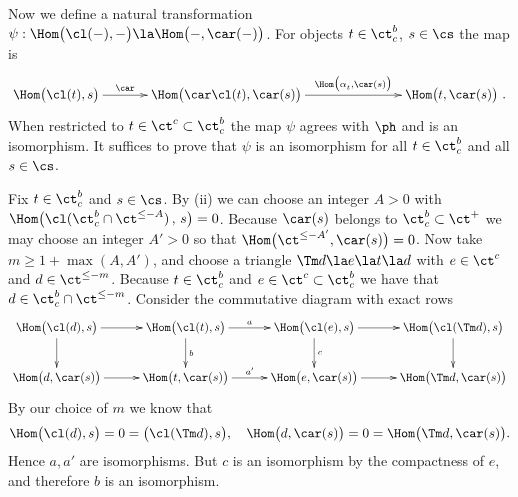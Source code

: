 \documentclass[11pt]{amsart}
\begin{document}
Now we define a natural
transformation $\psi:\Hom\big(\cl(-),-\big)\la \Hom\big(-,\car(-)\big)$.
For objects $t\in\ct^b_c$, $s\in\cs$ the map is
\[\xymatrix@C+10pt{
  \Hom\big(\cl(t),s\big)\ar[r]^-{\car}&\Hom\big(\car\cl(t),\car(s)\big)
  \ar[rr]^-{\Hom\big(\alpha_t^{},\car(s)\big)}
  &&\Hom\big(t,\car(s)\big)\ .
}\]
When restricted to $t\in\ct^c\subset\ct^b_c$ the map $\psi$ agrees with
$\ph$ and is an isomorphism. It suffices to prove that $\psi$ is
an isomorphism for all $t\in\ct^b_c$ and all $s\in\cs$. 

Fix $t\in\ct^b_c$ and $s\in\cs$. By (ii) we can choose an integer $A>0$ with
$\Hom\big(\cl(\ct^b_c\cap\ct^{\leq-A})\,,\,s\big)=0$. Because $\car(s)$ belongs
to $\ct^b_c\subset\ct^+$ we may choose an integer
$A'>0$ so that $\Hom\big(\ct^{\leq-A'},\car(s)\big)=0$. Now take $m\geq1+\max(A,A')$, and choose a triangle $\Tm d\la e\la t\la d$ with $e\in\ct^c$ and
$d\in\ct^{\leq-m}$. Because $t\in\ct^b_c$ and $e\in\ct^c\subset\ct^b_c$
we have that $d\in\ct^b_c\cap\ct^{\leq-m}$.
Consider the commutative diagram with exact rows
\[\xymatrix@C+5pt{
  \Hom\big(\cl(d),s\big)\ar[r]\ar[d]& \Hom\big(\cl(t),s\big)\ar[r]^-a\ar[d]^b&
  \Hom\big(\cl(e),s\big)\ar[r]\ar[d]^c&\Hom\big(\cl(\Tm d),s\big)\ar[d] \\
  \Hom\big(d,\car(s)\big)\ar[r] &\Hom\big(t,\car(s)\big)\ar[r]^{a'} &
  \Hom\big(e,\car(s)\big)\ar[r] &\Hom\big(\Tm d,\car(s)\big)
}\]
By our choice of $m$ we know that
\[
\Hom\big(\cl(d),s\big)=0=\big(\cl(\Tm d),s\big),\quad
\Hom\big(d,\car(s)\big)=0=\Hom\big(\Tm d,\car(s)\big).
\]
Hence $a,a'$ are isomorphisms. But $c$ is an isomorphism by the compactness of
$e$, and therefore $b$ is an isomorphism.
\eprf
\end{document}
